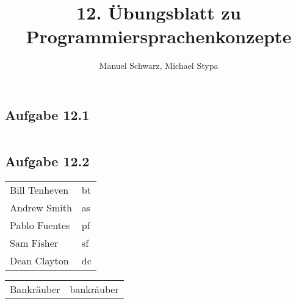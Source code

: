 \documentclass[a4paper, 12pt]{article}
\title{12. Übungsblatt zu Programmiersprachenkonzepte}
\author{Manuel Schwarz, Michael Stypa}
\begin{document}
\maketitle

\subsection*{Aufgabe 12.1}
\inputminted[]{prolog}{mengen.pl}

\subsection*{Aufgabe 12.2}
\begin{tabular}{ll}
  Bill Tenheven &   bt\\
  Andrew Smith  &   as\\
  Pablo Fuentes &   pf\\
  Sam Fisher    &   sf\\
  Dean Clayton  &   dc\\
\end{tabular}
\begin{tabular}{ll}
  Bankräuber &   bankräuber\\
\end{tabular}

\inputminted[]{prolog}{sheriff.pl}
\end{document}
